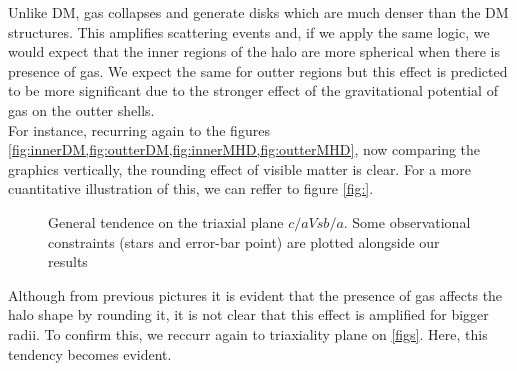  Unlike DM, gas collapses and generate disks which are much denser than the DM structures. This amplifies scattering events and, if we apply the same logic, we would expect that the inner regions of the halo are more spherical when there is presence of gas. We expect the same for outter regions but this effect is predicted to be more significant due to the stronger effect of the gravitational potential of gas on the outter shells.\\

For instance, recurring again to the figures \ref{fig:innerDM,fig:outterDM,fig:innerMHD,fig:outterMHD}, now comparing the graphics vertically, the rounding effect of visible matter is clear. For a more cuantitative illustration of this, we can reffer to figure \ref{fig:}. \\


\begin{figure}[!ht]
  \centering
  \hfill
  \hfill
  \caption{General tendence on the triaxial plane $c/a Vs b/a$. Some observational constraints (stars and error-bar point) are plotted alongside our results}
\end{figure}

Although from previous pictures it is evident that the presence of gas affects the halo shape by rounding it, it is not clear that this effect is amplified for bigger radii. To confirm this, we reccurr again to triaxiality plane on \ref{figs}. Here, this tendency becomes evident.\\


